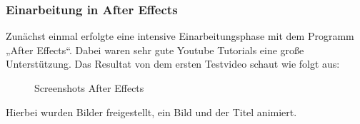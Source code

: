 \subsubsection{Einarbeitung in After Effects}
Zunächst einmal erfolgte eine intensive Einarbeitungsphase mit dem Programm „After Effects“. Dabei waren sehr gute Youtube Tutorials eine große Unterstützung. 
Das Resultat von dem ersten Testvideo schaut wie folgt aus: 
\begin{figure}[h]
\centering
\qquad
\caption{Screenshots After Effects}%
 \label{fig:Screenshots After Effect}%
\end{figure}
Hierbei wurden Bilder freigestellt, ein Bild und der Titel animiert.  

